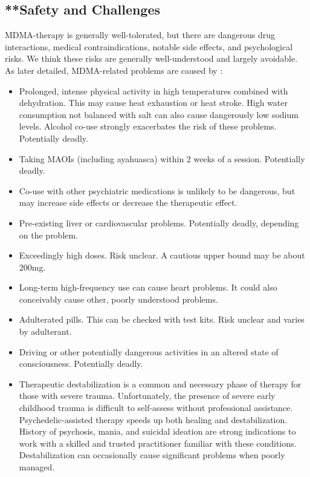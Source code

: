 \documentclass[12pt,letterpaper]{book}
\begin{document}
\subsection{**Safety and Challenges}
\label{sec:safety}
MDMA-therapy is generally well-tolerated, but there are dangerous drug interactions, medical contraindications, notable side effects, and psychological risks. We think these risks are generally well-understood and largely avoidable. As later detailed, MDMA-related problems are caused by \cite{riggDeaths,roxburghDeaths}:
\begin{itemize}
    \item Prolonged, intense physical activity in high temperatures combined with dehydration. This may cause heat exhaustion or heat stroke. High water consumption not balanced with salt can also cause dangerously low sodium levels. Alcohol co-use strongly exacerbates the risk of these problems. Potentially deadly.
    \item Taking MAOIs (including ayahuasca) within 2 weeks of a session. Potentially deadly.
    \item Co-use with other psychiatric medications is unlikely to be dangerous, but may increase side effects or decrease the therapeutic effect.
    \item Pre-existing liver or cardiovascular problems. Potentially deadly, depending on the problem.
    \item Exceedingly high doses. Risk unclear. A cautious upper bound may be about 200mg.
    \item Long-term high-frequency use can cause heart problems. It could also conceivably cause other, poorly understood problems.
    \item Adulterated pills. This can be checked with test kits. Risk unclear and varies by adulterant.
    \item Driving or other potentially dangerous activities in an altered state of consciousness. Potentially deadly.
    \item Therapeutic destabilization is a common and necessary phase of therapy for those with severe trauma. Unfortunately, the presence of severe early childhood trauma is difficult to self-assess without professional assistance. Psychedelic-assisted therapy speeds up both healing and destabilization. History of psychosis, mania, and suicidal ideation are strong indications to work with a skilled and trusted practitioner familiar with these conditions. Destabilization can occasionally cause significant problems when poorly managed.
\end{itemize}
\end{document}
